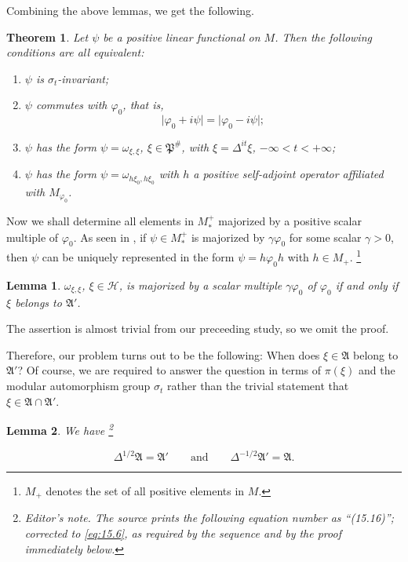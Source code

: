 \documentclass[12pt,b5paper,twoside]{article}
\theoremstyle{takesaki}
\newtheorem{theorem}{Theorem}[section]
\newtheorem{lemma}{Lemma}[section]
\numberwithin{equation}{section}
\newcounter{editorialnote}
\newcommand{\ednote}[1]{%
  \stepcounter{editorialnote}%
  \begingroup
  \renewcommand{\thefootnote}{E\arabic{editorialnote}}%
  \footnote{\textit{Editor's note.} #1}%
  \addtocounter{footnote}{-1}%
  \endgroup
}
\begin{document}
Combining the above lemmas, we get the following.

\begin{theorem}
\label{thm:15.2}
Let $\psi$ be a positive linear functional on $M$.  Then the following
conditions are all equivalent:
\begin{enumerate}[label=\arabic*$^{\circ}$]
  \item $\psi$ is $\sigma_t$-invariant;
  \item $\psi$ commutes with $\varphi_0$, that is,
  \[
    \lvert\varphi_0+i\psi\rvert=\lvert\varphi_0-i\psi\rvert;
  \]
  \item $\psi$ has the form $\psi=\omega_{\xi,\xi}$,
  $\xi\in\mathfrak P^{\#}$, with $\xi=\Delta^{it}\xi$,
  $-\infty<t<+\infty$;
  \item $\psi$ has the form
  $\psi=\omega_{h\xi_0,h\xi_0}$ with $h$ a positive self-adjoint
  operator affiliated with $M_{\varphi_0}$.
\end{enumerate}
\end{theorem}

Now we shall determine all elements in $M_*^+$ majorized by a positive
scalar multiple of $\varphi_0$.  As seen in , if
$\psi\in M_*^+$ is majorized by $\gamma\varphi_0$ for some scalar
$\gamma>0$, then $\psi$ can be uniquely represented in the form
$\psi=h\varphi_0h$ with $h\in M_+$.
\footnote{$M_+$ denotes the set of all positive elements in $M$.}

\begin{lemma}
\label{lem:15.12}
$\omega_{\xi,\xi}$, $\xi\in\mathcal H$, is majorized by a scalar
multiple $\gamma\varphi_0$ of $\varphi_0$ if and only if $\xi$ belongs
to $\mathfrak A'$.
\end{lemma}

The assertion is almost trivial from our preceeding study, so we omit
the proof.

Therefore, our problem turns out to be the following: When does
$\xi\in\mathfrak A$ belong to $\mathfrak A'$?  Of course, we are
required to answer the question in terms of $\pi(\xi)$ and the modular
automorphism group $\sigma_t$ rather than the trivial statement that
$\xi\in\mathfrak A\cap\mathfrak A'$.

\begin{lemma}
\label{lem:15.13}
We have\ednote{The source prints the following equation number as
  ``(15.16)''; corrected to \eqref{eq:15.6}, as required by the sequence and by
the proof immediately below.}
\begin{equation}
  \Delta^{1/2}\mathfrak A=\mathfrak A'
  \qquad\text{and}\qquad
  \Delta^{-1/2}\mathfrak A'=\mathfrak A.
  \tag{15.6}\label{eq:15.6}
\end{equation}
\end{lemma}
\end{document}
